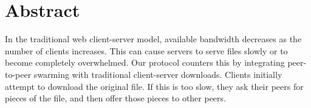\section {Abstract}
In the traditional web client-server model, available bandwidth decreases as the number of clients increases.  
This can cause servers to serve files slowly or to become completely overwhelmed.  
Our protocol counters this by integrating peer-to-peer swarming with traditional client-server downloads.  
Clients initially attempt to download the original file.  If this is too slow, they ask their peers for pieces of the file, 
and then offer those pieces to other peers.